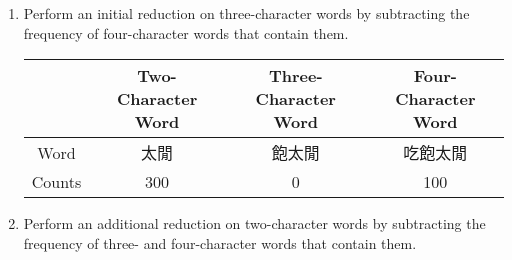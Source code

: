 \documentclass[12pt,a4paper]{report}
\theoremstyle{definition}
\begin{document}
\begin{CJK}{UTF8}{bsmi}
\begin{CJK}{UTF8}{bsmi}
\begin{enumerate}
        \item Perform an initial reduction on three-character words by subtracting the frequency of four-character words that contain them.
        \newline
   
        \begin{table}[H]
        \centering
        \begin{tabular}{|c|c|c|c|}
            \hline
             & Two-Character Word  & Three-Character Word  & Four-Character Word  \\
            \hline
            Word & 太閒 & 飽太閒 & 吃飽太閒\\
            \hline
            Counts & 300 & 0 & 100 \\
            \hline
        \end{tabular}
        \end{table}
        \item Perform an additional reduction on two-character words by subtracting the frequency of three- and four-character words that contain them.
        \newline
   

\end{enumerate}
\end{CJK}
\end{CJK}
\end{document}
